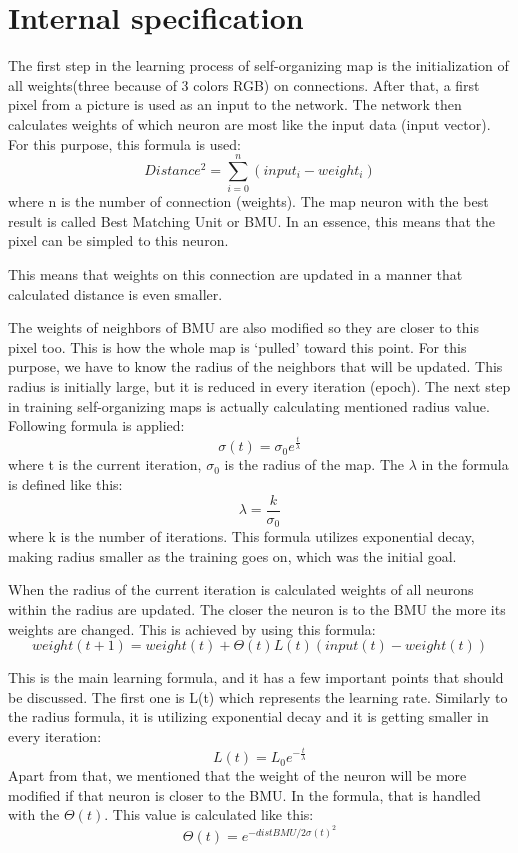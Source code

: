 \documentclass[12pt,a4paper]{article}
\begin{document}
\section{Internal specification}
The first step in the learning process of self-organizing map is the initialization of all weights(three because of 3 colors RGB) on connections. After that, a first pixel from a picture is used as an input to the network. The network then calculates weights of which neuron are most like the input data (input vector). For this purpose, this formula is used:
\[Distance^2 = \sum_{i=0}^{n} (input_i - weight_i) \]
where n is the number of connection (weights). The map neuron with the best result is called Best Matching Unit or BMU. In an essence, this means that the pixel can be simpled to this neuron.

This means that weights on this connection are updated in a manner that calculated distance is even smaller.

The weights of neighbors of BMU are also modified so they are closer to this pixel too. This is how the whole map is ‘pulled’ toward this point. For this purpose, we have to know the radius of the neighbors that will be updated. This radius is initially large, but it is reduced in every iteration (epoch). The next step in training self-organizing maps is actually calculating mentioned radius value. Following formula is applied:
\[ \sigma(t) = \sigma_0e^{\frac{t}{\lambda}} \]
where t is the current iteration, $\sigma_0$ is the radius of the map. The $\lambda$ in the formula is defined like this:
\[ \lambda=\frac{k}{\sigma_0} \]
where k is the number of iterations. This formula utilizes exponential decay, making radius smaller as the training goes on, which was the initial goal.

When the radius of the current iteration is calculated weights of all neurons within the radius are updated. The closer the neuron is to the BMU the more its weights are changed. This is achieved by using this formula:
\[ weight(t+1)=weight(t)+\Theta(t)L(t)(input(t)-weight(t)) \]

This is the main learning formula, and it has a few important points that should be discussed. The first one is L(t) which represents the learning rate. Similarly to the radius formula, it is utilizing exponential decay and it is getting smaller in every iteration:
\[ L(t)=L_0e^{-\frac{t}{\lambda}} \]
Apart from that, we mentioned that the weight of the neuron will be more modified if that neuron is closer to the BMU. In the formula, that is handled with the $\Theta(t)$. This value is calculated like this:
\[ \Theta(t)=e^{-distBMU/2\sigma(t)^2} \]
\end{document}
